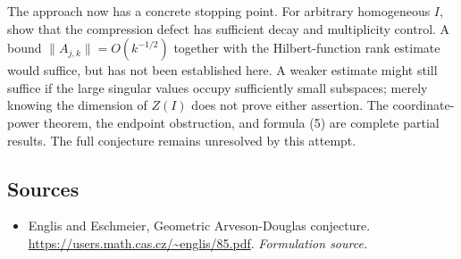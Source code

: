 \documentclass[11pt]{article}
\begin{document}
The approach now has a concrete stopping point. For arbitrary homogeneous $I$, show that the compression defect has sufficient decay and multiplicity control. A bound $\|A_{j,k}\|=O(k^{-1/2})$ together with the Hilbert-function rank estimate would suffice, but has not been established here. A weaker estimate might still suffice if the large singular values occupy sufficiently small subspaces; merely knowing the dimension of $Z(I)$ does not prove either assertion. The coordinate-power theorem, the endpoint obstruction, and formula (5) are complete partial results. The full conjecture remains unresolved by this attempt.

\subsection{Sources}
\begin{itemize}
\item[S1]Englis and Eschmeier, Geometric Arveson-Douglas conjecture.
\url{https://users.math.cas.cz/~englis/85.pdf}.
\textit{Formulation source.}
\end{itemize}
\end{document}
